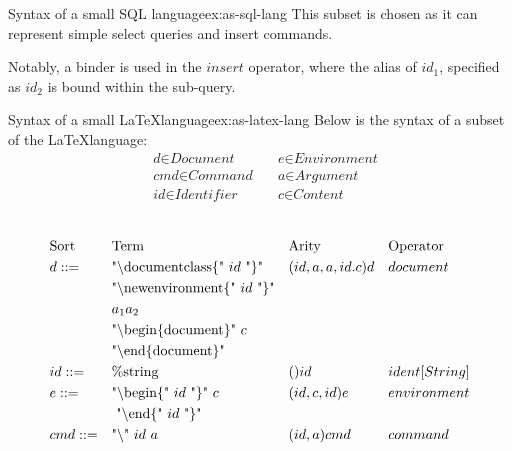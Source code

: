 \begin{example}{Syntax of a small SQL language}{ex:as-sql-lang}
  This subset is chosen as it can represent simple select queries and insert commands.

  Notably, a binder is used in the $insert$ operator, where the alias of $id_1$, specified as $id_2$ is bound within the sub-query.
\end{example}

\begin{example}{Syntax of a small \LaTeX language}{ex:as-latex-lang}
  Below is the syntax of a subset of the \LaTeX language:
  \[
    \begin{aligned}
       & \textit{d} \in \textit{Document}    \quad & \textit{e} \in \textit{Environment} \\
       & \textit{cmd} \in \textit{Command}   \quad & \textit{a} \in \textit{Argument}    \\
       & \textit{id} \in \textit{Identifier} \quad & \textit{c} \in \textit{Content}     \\
    \end{aligned}
  \]
  \\
  \[
    \begin{aligned}
       & \text{Sort} &  & \text{Term}                             &  & \text{Arity}   &  & \text{Operator}     \\
       & d ::=       &  & \text{"\bs documentclass\{" $id$ "\}"}  &  & (id,a,a,id.c)d &  & document            \\
       &             &  & \text{"\bs newenvironment\{" $id$ "\}"} &  &                &  &                     \\
       &             &  & \text{$a_1$} \textit{$a_2$}             &  &                &  &                     \\
       &             &  & \text{"\bs begin\{document\}" $c$}      &  &                &  &                     \\
       &             &  & \text{"\bs end\{document\}"}            &  &                &  &                     \\
       & id ::=      &  & \text{\%string}                         &  & ()id           &  & ident[String]       \\
       & e ::=       &  & \text{"\bs begin\{" $id$ "\}" $c$}      &  & (id,c,id)e     &  & environment         \\
       &             &  & \text{ "\bs end\{" $id$ "\}"}           &  &                &  &                     \\
       & cmd ::=     &  & \text{"\bs " $id$ $a$}                  &  & (id,a)cmd      &  & command             \\

\end{aligned}\]
\end{example}
